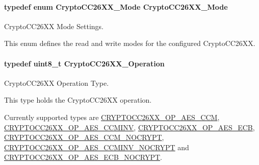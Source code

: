 \paragraph[{Crypto\+C\+C26\+X\+X\+\_\+\+Mode}]{\setlength{\rightskip}{0pt plus 5cm}typedef enum {\bf Crypto\+C\+C26\+X\+X\+\_\+\+Mode}  {\bf Crypto\+C\+C26\+X\+X\+\_\+\+Mode}}\label{_crypto_c_c26_x_x_8h_a2a7a223869fb2c7f4b577f3552563d16}


Crypto\+C\+C26\+X\+X Mode Settings. 

This enum defines the read and write modes for the configured Crypto\+C\+C26\+X\+X. 
\paragraph[{Crypto\+C\+C26\+X\+X\+\_\+\+Operation}]{\setlength{\rightskip}{0pt plus 5cm}typedef uint8\+\_\+t {\bf Crypto\+C\+C26\+X\+X\+\_\+\+Operation}}\label{_crypto_c_c26_x_x_8h_a28465385e5b45efecc00f2015605f970}


Crypto\+C\+C26\+X\+X Operation Type. 

This type holds the Crypto\+C\+C26\+X\+X operation.

Currently supported types are \hyperlink{_crypto_c_c26_x_x_8h_a6ab0b59b64c06856c431f91a7e43b34d}{C\+R\+Y\+P\+T\+O\+C\+C26\+X\+X\+\_\+\+O\+P\+\_\+\+A\+E\+S\+\_\+\+C\+C\+M}, \hyperlink{_crypto_c_c26_x_x_8h_a38c8bce4f77947e99d2d877e8d3dee7e}{C\+R\+Y\+P\+T\+O\+C\+C26\+X\+X\+\_\+\+O\+P\+\_\+\+A\+E\+S\+\_\+\+C\+C\+M\+I\+N\+V}, \hyperlink{_crypto_c_c26_x_x_8h_a9e96510f981e65f0c46c19684daaff07}{C\+R\+Y\+P\+T\+O\+C\+C26\+X\+X\+\_\+\+O\+P\+\_\+\+A\+E\+S\+\_\+\+E\+C\+B}, \hyperlink{_crypto_c_c26_x_x_8h_acc1c159d62112b90da86ecd846994f98}{C\+R\+Y\+P\+T\+O\+C\+C26\+X\+X\+\_\+\+O\+P\+\_\+\+A\+E\+S\+\_\+\+C\+C\+M\+\_\+\+N\+O\+C\+R\+Y\+P\+T}, \hyperlink{_crypto_c_c26_x_x_8h_a445002cd50ecda94d48f437bc213a499}{C\+R\+Y\+P\+T\+O\+C\+C26\+X\+X\+\_\+\+O\+P\+\_\+\+A\+E\+S\+\_\+\+C\+C\+M\+I\+N\+V\+\_\+\+N\+O\+C\+R\+Y\+P\+T} and \hyperlink{_crypto_c_c26_x_x_8h_aea29a252e094057f90d0fccd938b8a0d}{C\+R\+Y\+P\+T\+O\+C\+C26\+X\+X\+\_\+\+O\+P\+\_\+\+A\+E\+S\+\_\+\+E\+C\+B\+\_\+\+N\+O\+C\+R\+Y\+P\+T}. 
